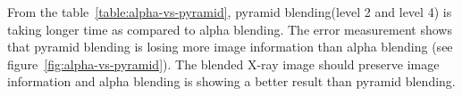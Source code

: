 \noindent From the table~\ref{table:alpha-vs-pyramid}, pyramid blending(level 2 and level 4) is taking longer time as compared to alpha blending. The error measurement shows that pyramid blending is losing more image information than alpha blending (see figure~\ref{fig:alpha-vs-pyramid}). The blended X-ray image should preserve image information and alpha blending is showing a better result than pyramid blending.

\begin{figure}[H]%
\centering
{} \quad

\end{figure}
